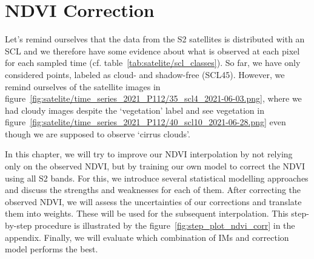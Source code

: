 \chapter{NDVI Correction} \label{sec:corr}

{
    Let's remind ourselves that the data from the S2 satellites is distributed  with an SCL and we therefore have some evidence about what is observed at each pixel for each sampled time (cf. table~\ref{tab:satelite/scl_classes}). So far, we have only considered points, labeled as cloud- and shadow-free (SCL45). However, we remind ourselves of the satellite images in figure~\ref{fig:satelite/time_series_2021_P112/35_scl4_2021-06-03.png}, where we had cloudy images despite the `vegetation' label and see vegetation in figure~\ref{fig:satelite/time_series_2021_P112/40_scl10_2021-06-28.png} even though we are supposed to observe `cirrus clouds'.
    


    
    In this chapter, we will try to improve our NDVI interpolation by not relying only on the observed NDVI, but by training our own model to correct the NDVI using all S2 bands. For this, we introduce several statistical modelling approaches and discuss the strengths and weaknesses for each of them. After correcting the observed NDVI, we will assess the uncertainties of our corrections and translate them into weights. These will be used for the subsequent interpolation. This step-by-step procedure is illustrated by the figure~\ref{fig:step_plot_ndvi_corr} in the appendix. Finally, we will evaluate which combination of {{IM}}s and correction model performs the best.
}

